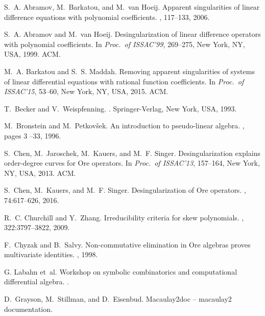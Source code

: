 \documentclass{sig-alternate}
\begin{document}

\def\cprime{$'$}
\begin{thebibliography}{10}

S.~A. Abramov, M.~Barkatou, and M.~van Hoeij.
\newblock Apparent singularities of linear difference equations with polynomial
  coefficients.
, 117--133, 2006.

S.~A. Abramov and M.~van Hoeij.
\newblock Desingularization of linear difference operators with polynomial
  coefficients.
\newblock In {\em Proc.\ of ISSAC'99}, 269--275, New York, NY,
  USA, 1999. ACM.

M.~A. Barkatou and S.~S. Maddah.
\newblock Removing apparent singularities of systems of linear differential
  equations with rational function coefficients.
\newblock In {\em Proc.\ of ISSAC'15}, 53--60, New York, NY,
  USA, 2015. ACM.

T.~Becker and V.~Weispfenning.
.
\newblock Springer-Verlag, New York,
  USA, 1993.

M.~Bronstein and M.~Petkov\v{s}ek.
\newblock An introduction to pseudo-linear algebra.
, pages 3 --33, 1996.

S.~Chen, M.~Jaroschek, M.~Kauers, and M.~F. Singer.
\newblock Desingularization explains order-degree curves for {O}re operators.
\newblock In {\em Proc.\ of ISSAC'13}, 157--164, New York, NY,
  USA, 2013. ACM.

S.~Chen, M.~Kauers, and M.~F. Singer.
\newblock Desingularization of {O}re operators.
, 74:617--626, 2016.

R.~C. Churchill and Y.~Zhang.
\newblock Irreducibility criteria for skew polynomials.
, 322:3797--3822, 2009.

F.~Chyzak and B.~Salvy.
\newblock Non-commutative elimination in {O}re algebras proves multivariate
  identities.
, 1998.


G. Labahn et~al.
\newblock Workshop on symbolic combinatorics and computational differential
  algebra.
.

D.~Grayson, M.~Stillman, and D.~Eisenbud.
\newblock Macaulay2doc -- macaulay2 documentation.


\end{thebibliography}
\end{document}

